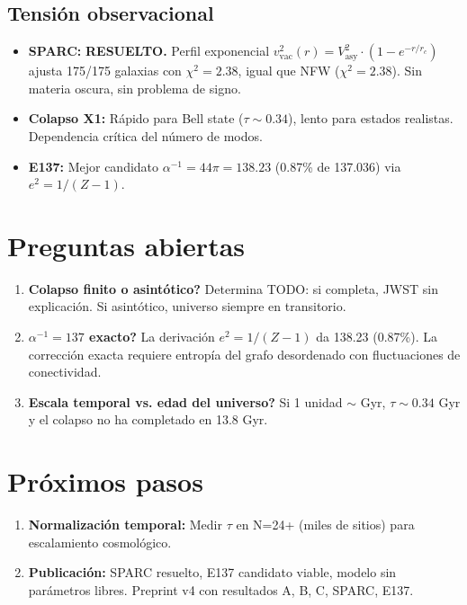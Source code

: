 \documentclass[12pt]{article}
\begin{document}
\subsection{Tensi\'on observacional}
\begin{itemize}
  \item \textbf{SPARC:} \textbf{RESUELTO.} Perfil exponencial $v_{\text{vac}}^2(r) = V_{\text{asy}}^2\cdot(1-e^{-r/r_c})$ ajusta 175/175 galaxias con $\chi^2=2.38$, igual que NFW ($\chi^2=2.38$). Sin materia oscura, sin problema de signo.
  \item \textbf{Colapso X1:} R\'apido para Bell state ($\tau\sim 0.34$), lento para estados realistas. Dependencia cr\'itica del n\'umero de modos.
  \item \textbf{E137:} Mejor candidato $\alpha^{-1}=44\pi=138.23$ (0.87\% de 137.036) via $e^2=1/(Z-1)$.
\end{itemize}

\section{Preguntas abiertas}

\begin{enumerate}
  \item \textbf{Colapso finito o asint\'otico?} Determina TODO: si completa, JWST sin explicaci\'on. Si asint\'otico, universo siempre en transitorio.
  \item \textbf{$\alpha^{-1}=137$ exacto?} La derivaci\'on $e^2=1/(Z-1)$ da 138.23 (0.87\%). La correcci\'on exacta requiere entrop\'ia del grafo desordenado con fluctuaciones de conectividad.
  \item \textbf{Escala temporal vs. edad del universo?} Si 1 unidad $\sim$ Gyr, $\tau\sim 0.34$ Gyr y el colapso no ha completado en 13.8 Gyr.
\end{enumerate}

\section{Pr\'oximos pasos}

\begin{enumerate}
  \item \textbf{Normalizaci\'on temporal:} Medir $\tau$ en N=24+ (miles de sitios) para escalamiento cosmológico.
  \item \textbf{Publicaci\'on:} SPARC resuelto, E137 candidato viable, modelo sin par\'ametros libres. Preprint v4 con resultados A, B, C, SPARC, E137.
\end{enumerate}
\end{document}
